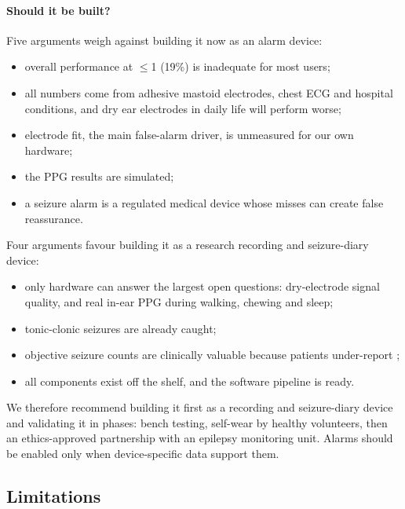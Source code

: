 \paragraph{Should it be built?} Five arguments weigh against building it now as an alarm device:
\begin{itemize}
\item overall performance at $\le$1 \FAd{} (19\%) is inadequate for most users;
\item all numbers come from adhesive mastoid electrodes, chest ECG and hospital conditions, and dry ear electrodes in daily life will perform worse;
\item electrode fit, the main false-alarm driver, is unmeasured for our own hardware;
\item the PPG results are simulated;
\item a seizure alarm is a regulated medical device whose misses can create false reassurance.
\end{itemize}
Four arguments favour building it as a research recording and seizure-diary device:
\begin{itemize}
\item only hardware can answer the largest open questions: dry-electrode signal quality, and real in-ear PPG during walking, chewing and sleep;
\item tonic-clonic seizures are already caught;
\item objective seizure counts are clinically valuable because patients under-report \cite{hoppe2007,elger2018};
\item all components exist off the shelf, and the software pipeline is ready.
\end{itemize}
We therefore recommend building it first as a recording and seizure-diary device and validating it in phases: bench testing, self-wear by healthy volunteers, then an ethics-approved partnership with an epilepsy monitoring unit. Alarms should be enabled only when device-specific data support them.

\subsection{Limitations}

